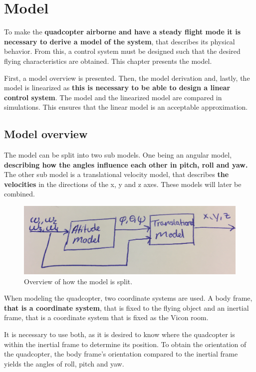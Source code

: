 \chapter{Model}
To make the \textbf{quadcopter airborne and have a steady flight mode it is necessary to derive a model of the system}, that describes its physical behavior. From this, a control system must be designed such that the desired flying characteristics are obtained. 
This chapter presents the model. 

First, a model overview is presented. Then, the model derivation and, lastly, the model is linearized as \textbf{this is necessary to be able to design a linear control system}. The model and the linearized model are compared in simulations. This ensures that the linear model is an acceptable approximation.

\section{Model overview}
The model can be split into two sub models. One being an angular model, \textbf{describing how the angles influence each other in pitch, roll and yaw.} The other sub model is a translational velocity model, that describes \textbf{the velocities} in the directions of the x, y and z axes. 
These models will later be combined. 
\begin{figure}[H]
\centering
\includegraphics[scale=0.1]{figures/modeloverview.PNG}
\caption{Overview of how the model is split.}
\label{sss}
\end{figure}
When modeling the quadcopter, two coordinate systems are used. A body frame,\textbf{ that is a coordinate system}, that is fixed to the flying object and an inertial frame, that is a coordinate system that is fixed as the Vicon room. 

It is necessary to use both, as it is desired to know where the quadcopter is within the inertial frame to determine its position. To obtain the orientation of the quadcopter, the body frame's orientation compared to the inertial frame yields the angles of roll, pitch and yaw. 


